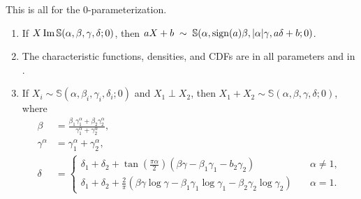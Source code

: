 \documentclass[twoside,10pt]{report}
\begin{document}
\begin{prop}
	This is all for the 0-parameterization.
\begin{enumerate}
	\item If $X \operatorname{Im} \mathbb{S}(\alpha,\beta,\gamma,\delta;0)$, then $aX + b \;\sim\; \mathbb{S}(\alpha, \operatorname{sign}(a)\beta, |\alpha|\gamma, a \delta+b;0)$.
	\item The characteristic functions, densities, and CDFs are in all parameters and in .
	\item If $X_{i} \sim \mathbb{S}(\alpha,\beta_{i},\gamma_{i},\delta_{i};0)$ and $X_1 \perp X_2$, then $X_1+X_2 \sim \mathbb{S}(\alpha,\beta,\gamma,\delta;0)$, where
		\begin{align*}
			\beta &= \frac{\beta_1 \gamma_1^{\alpha} + \beta_2 \gamma_2^{\alpha}}{\gamma_1^{\alpha}+\gamma_2^{\alpha}} ,\\
			\gamma^{\alpha} &= \gamma_1^{\alpha} + \gamma_2^{\alpha},\\
			\delta&=
			\begin{cases}
				\delta_1+\delta_2+\tan\left( \frac{\pi \alpha}{2}  \right)\left( \beta \gamma - \beta_1 \gamma_1 - b_2 \gamma_2 \right) & \quad\alpha \neq 1,\\
				\delta_1 + \delta_2 + \frac{2}{\pi} \left( \beta \gamma \log \gamma - \beta_1 \gamma_1 \log \gamma_1 - \beta_2 \gamma_2 \log \gamma_2 \right) & \quad\alpha=1.
			\end{cases}
		\end{align*}
\end{enumerate}
\end{prop}
\end{document}
